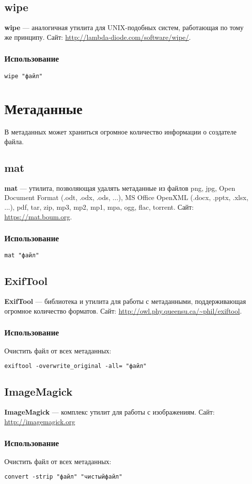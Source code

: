\subsection{wipe}
\textbf{wipe} --- аналогичная утилита для UNIX-подобных систем, работающая по тому же принципу. Сайт: \url{http://lambda-diode.com/software/wipe/}.
\subsubsection{Использование}
\begin{lstlisting}
wipe "файл"
\end{lstlisting}
\section{Метаданные}
\begin{important}
В метаданных может храниться огромное количество информации о создателе файла.
\end{important}
\subsection{mat}
\textbf{mat} --- утилита, позволяющая удалять метаданные из файлов png, jpg, Open Document Format (.odt, .odx, .ods, ...), MS Office OpenXML (.docx, .pptx, .xlsx, ...), pdf, tar, zip, mp3, mp2, mp1, mpa, ogg, flac, torrent. Сайт: \url{https://mat.boum.org}.
\subsubsection{Использование}
\begin{lstlisting}
mat "файл"
\end{lstlisting}
\subsection{ExifTool}
\textbf{ExifTool} --- библиотека и утилита для работы с метаданными, поддерживающая огромное количество форматов. Сайт: \url{http://owl.phy.queensu.ca/~phil/exiftool}.
\subsubsection{Использование}
Очистить файл от всех метаданных:
\begin{lstlisting}
exiftool -overwrite_original -all= "файл"
\end{lstlisting}
\subsection{ImageMagick}
\textbf{ImageMagick} --- комплекс утилит для работы с изображениям. Сайт: \url{http://imagemagick.org}
\subsubsection{Использование}
Очистить файл от всех метаданных:
\begin{lstlisting}
convert -strip "файл" "чистыйфайл"
\end{lstlisting}
